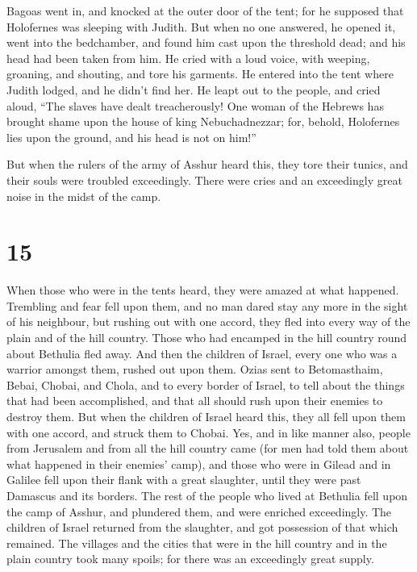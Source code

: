  Bagoas went in, and knocked at the outer door of the tent;
for he supposed that Holofernes was sleeping with Judith. 
But when no one answered, he opened it, went into the bedchamber, and
found him cast upon the threshold dead; and his head had been taken from
him.  He cried with a loud voice, with weeping, groaning,
and shouting, and tore his garments.  He entered into the
tent where Judith lodged, and he didn't find her. He leapt out to the
people, and cried aloud,  ``The slaves have dealt
treacherously! One woman of the Hebrews has brought shame upon the house
of king Nebuchadnezzar; for, behold, Holofernes lies upon the ground,
and his head is not on him!''

 But when the rulers of the army of Asshur heard this, they
tore their tunics, and their souls were troubled exceedingly. There were
cries and an exceedingly great noise in the midst of the camp.

\hypertarget{section-14}{%
\section{15}\label{section-14}}

 When those who were in the tents heard, they were amazed at
what happened.  Trembling and fear fell upon them, and no
man dared stay any more in the sight of his neighbour, but rushing out
with one accord, they fled into every way of the plain and of the hill
country.  Those who had encamped in the hill country round
about Bethulia fled away. And then the children of Israel, every one who
was a warrior amongst them, rushed out upon them.  Ozias
sent to Betomasthaim, Bebai, Chobai, and Chola, and to every border of
Israel, to tell about the things that had been accomplished, and that
all should rush upon their enemies to destroy them.  But
when the children of Israel heard this, they all fell upon them with one
accord, and struck them to Chobai. Yes, and in like manner also, people
from Jerusalem and from all the hill country came (for men had told them
about what happened in their enemies' camp), and those who were in
Gilead and in Galilee fell upon their flank with a great slaughter,
until they were past Damascus and its borders.  The rest of
the people who lived at Bethulia fell upon the camp of Asshur, and
plundered them, and were enriched exceedingly.  The children
of Israel returned from the slaughter, and got possession of that which
remained. The villages and the cities that were in the hill country and
in the plain country took many spoils; for there was an exceedingly
great supply.

